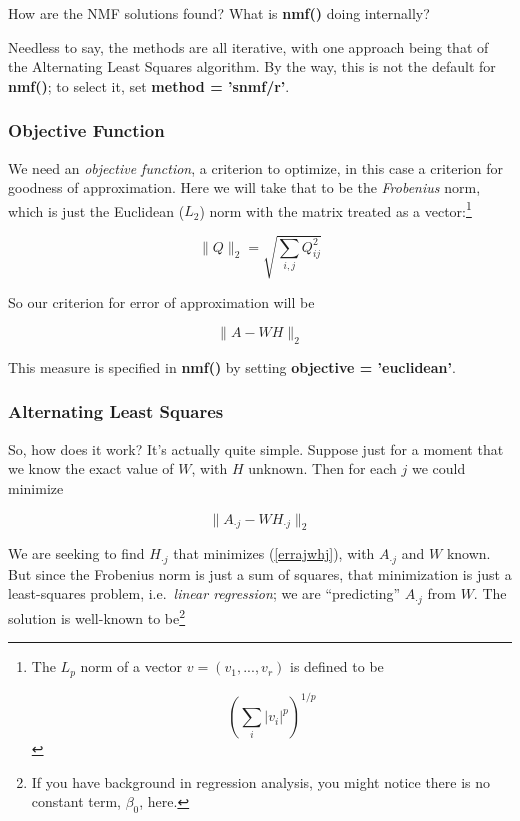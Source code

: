 How are the NMF solutions found?  What is {\bf nmf()} doing internally?

Needless to say, the methods are all iterative, with one approach being
that of the Alternating Least Squares algorithm.  By the way, this is
not the default for {\bf nmf()}; to select it, set {\bf method =
'snmf/r'}.

\subsubsection{Objective Function}

We need an {\it objective function}, a criterion to optimize, in this
case a criterion for goodness of approximation. Here we will take that
to be the {\it Frobenius} norm, which is just the Euclidean ($L_2$)
norm with the matrix treated as a vector:\footnote{The $L_p$ norm of a
vector $v = (v_1,...,v_r)$ is defined to be

$$
\left (\sum_i |v_i|^p \right )^{1/p}
$$
}

\begin{equation}
\|Q\|_2 = 
\sqrt{
\sum_{i,j} Q_{ij}^2
}
\end{equation}

So our criterion for error of approximation will be

\begin{equation}
\label{errawh}
\|A - WH\|_2
\end{equation}

This measure is specified in {\bf nmf()} by setting {\bf objective =
'euclidean'}.

\subsubsection{Alternating Least Squares}

So, how does it work?  It's actually quite simple.  Suppose just for a
moment that we know the exact value of $W$, with $H$ unknown.  Then for
each $j$ we could minimize

\begin{equation}
\label{errajwhj}
\|A_{\cdot j} - W H_{\cdot j}\|_2
\end{equation}

We are seeking to find $H_{\cdot j}$ that minimizes (\ref{errajwhj}),
with $A_{\cdot j}$ and $W$ known.  But since the Frobenius norm is just
a sum of squares, that minimization is just a least-squares problem,
i.e.\ {\it linear regression}; we are ``predicting'' $A_{\cdot j}$ from
$W$.  The solution is well-known to be\footnote{If you have background
in regression analysis, you might notice there is no constant term,
$\beta_0$, here.}

